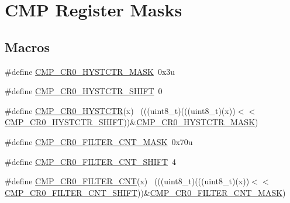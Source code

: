 \hypertarget{group___c_m_p___register___masks}{}\section{C\+MP Register Masks}
\label{group___c_m_p___register___masks}
\subsection*{Macros}
\begin{DoxyCompactItemize}
\item 
\#define \hyperlink{group___c_m_p___register___masks_ga9a81a95d8ceda15abb107f3c961e2f03}{C\+M\+P\+\_\+\+C\+R0\+\_\+\+H\+Y\+S\+T\+C\+T\+R\+\_\+\+M\+A\+SK}~0x3u
\item 
\#define \hyperlink{group___c_m_p___register___masks_ga12a965eae39b79d9e6066de9af418df3}{C\+M\+P\+\_\+\+C\+R0\+\_\+\+H\+Y\+S\+T\+C\+T\+R\+\_\+\+S\+H\+I\+FT}~0
\item 
\#define \hyperlink{group___c_m_p___register___masks_ga3ac2621a332671b38fa231e1fa14d26d}{C\+M\+P\+\_\+\+C\+R0\+\_\+\+H\+Y\+S\+T\+C\+TR}(x)                                          ~(((uint8\+\_\+t)(((uint8\+\_\+t)(x))$<$$<$\hyperlink{group___c_m_p___register___masks_ga12a965eae39b79d9e6066de9af418df3}{C\+M\+P\+\_\+\+C\+R0\+\_\+\+H\+Y\+S\+T\+C\+T\+R\+\_\+\+S\+H\+I\+FT}))\&\hyperlink{group___c_m_p___register___masks_ga9a81a95d8ceda15abb107f3c961e2f03}{C\+M\+P\+\_\+\+C\+R0\+\_\+\+H\+Y\+S\+T\+C\+T\+R\+\_\+\+M\+A\+SK})
\item 
\#define \hyperlink{group___c_m_p___register___masks_gab1e98c122818fe880217f72fab932ac2}{C\+M\+P\+\_\+\+C\+R0\+\_\+\+F\+I\+L\+T\+E\+R\+\_\+\+C\+N\+T\+\_\+\+M\+A\+SK}~0x70u
\item 
\#define \hyperlink{group___c_m_p___register___masks_ga07a4d57ab7d44b55b3d73f612aa7dd98}{C\+M\+P\+\_\+\+C\+R0\+\_\+\+F\+I\+L\+T\+E\+R\+\_\+\+C\+N\+T\+\_\+\+S\+H\+I\+FT}~4
\item 
\#define \hyperlink{group___c_m_p___register___masks_gad9cbe394311ddbb43945fcdade409c9e}{C\+M\+P\+\_\+\+C\+R0\+\_\+\+F\+I\+L\+T\+E\+R\+\_\+\+C\+NT}(x)                                    ~(((uint8\+\_\+t)(((uint8\+\_\+t)(x))$<$$<$\hyperlink{group___c_m_p___register___masks_ga07a4d57ab7d44b55b3d73f612aa7dd98}{C\+M\+P\+\_\+\+C\+R0\+\_\+\+F\+I\+L\+T\+E\+R\+\_\+\+C\+N\+T\+\_\+\+S\+H\+I\+FT}))\&\hyperlink{group___c_m_p___register___masks_gab1e98c122818fe880217f72fab932ac2}{C\+M\+P\+\_\+\+C\+R0\+\_\+\+F\+I\+L\+T\+E\+R\+\_\+\+C\+N\+T\+\_\+\+M\+A\+SK})
\item 

\end{DoxyCompactItemize}
